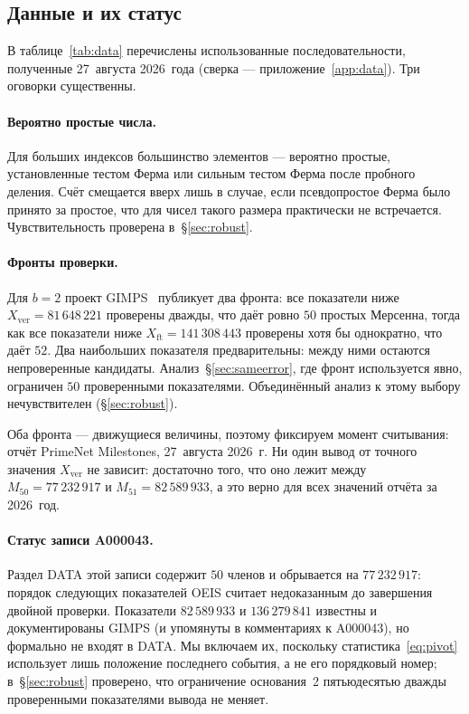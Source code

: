 \documentclass[11pt,a4paper]{article}
\theoremstyle{plain}
\theoremstyle{remark}
\begin{document}
\subsection{Данные и их статус}
В таблице~\ref{tab:data} перечислены использованные последовательности,
полученные 27~августа 2026~года (сверка --- приложение~\ref{app:data}).
Три оговорки существенны.

\paragraph{Вероятно простые числа.} Для больших индексов большинство элементов ---
вероятно простые, установленные тестом Ферма или сильным тестом Ферма после пробного
деления. Счёт смещается вверх лишь в случае, если псевдопростое Ферма было принято за
простое, что для чисел такого размера практически не встречается. Чувствительность
проверена в~\S\ref{sec:robust}.

\paragraph{Фронты проверки.} Для $b=2$ проект GIMPS~\cite{gimps} публикует два фронта:
все показатели ниже $X_{\mathrm{ver}}=81\,648\,221$ проверены дважды, что даёт ровно $50$
простых Мерсенна, тогда как все показатели ниже $X_{\mathrm{ft}}=141\,308\,443$ проверены
хотя бы однократно, что даёт $52$. Два наибольших показателя предварительны: между ними
остаются непроверенные кандидаты. Анализ~\S\ref{sec:sameerror}, где фронт используется
явно, ограничен $50$ проверенными показателями. Объединённый анализ к этому выбору
нечувствителен (\S\ref{sec:robust}).

Оба фронта --- движущиеся величины, поэтому фиксируем момент считывания: отчёт
PrimeNet Milestones, 27~августа 2026~г. Ни один вывод от точного значения
$X_{\mathrm{ver}}$ не зависит: достаточно того, что оно лежит между
$M_{50}=77\,232\,917$ и $M_{51}=82\,589\,933$, а это верно для всех значений отчёта
за 2026~год.

\paragraph{Статус записи A000043.} Раздел DATA этой записи содержит $50$ членов и
обрывается на $77\,232\,917$: порядок следующих показателей OEIS считает недоказанным
до завершения двойной проверки. Показатели $82\,589\,933$ и $136\,279\,841$ известны и
документированы GIMPS (и упомянуты в комментариях к A000043), но формально не входят в
DATA. Мы включаем их, поскольку статистика~\eqref{eq:pivot} использует лишь положение
последнего события, а не его порядковый номер; в~\S\ref{sec:robust} проверено, что
ограничение основания~2 пятьюдесятью дважды проверенными показателями вывода не меняет.
\end{document}
